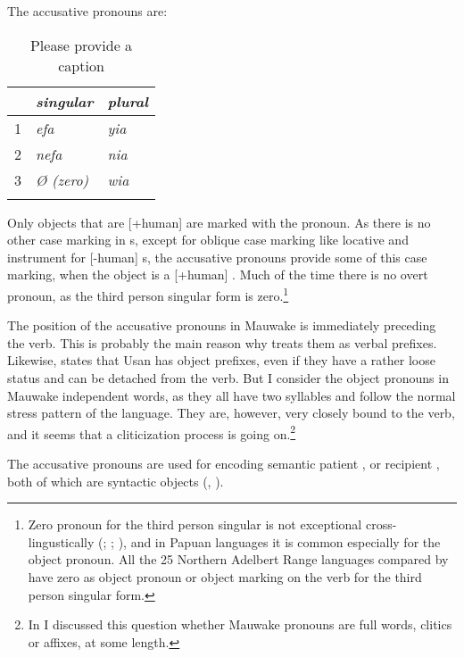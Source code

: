 The accusative pronouns are:

\begin{table}
\caption{Please provide a caption}
 
\begin{tabular}{l>{\itshape}l>{\itshape}l}
\mytoprule
 &\upshape singular &\upshape plural\\
\midrule
1 &efa &yia\\
2 &nefa &nia\\
3 &{\O} (zero) &wia\\
\mybottomrule
\end{tabular}
\end{table}


Only objects that are [+human] are marked with the pronoun. As there is no other case marking in s, except for oblique case marking like locative and instrument for [\nobreakdash-human] s, the accusative pronouns provide some of this case marking, when the object is a [+human] . Much of the time there is no overt pronoun, as the third person singular form is zero.\footnote{Zero pronoun for the third person singular is not exceptional cross-lingustically (\citealt[278]{Lyons1968}; \citealt[66]{Foley1986}; \citealt[166]{Givon1976}), and in Papuan languages it is common especially for the object pronoun. All the 25 Northern Adelbert Range languages compared by \citet[9,160]{ZGraggen1980} have zero as object pronoun or object marking on the verb for the third person singular form.} 

The position of the accusative pronouns in Mauwake is immediately preceding the verb. This is probably the main reason why \citet{ZGraggen1971} treats them as verbal prefixes. Likewise, \citet[108]{Reesink1987} states that Usan has object prefixes, even if they have a rather loose status and can be detached from the verb. But I consider the object pronouns in Mauwake independent words, as they all have two syllables and follow the normal stress pattern of the language. They are, however, very closely bound to the verb, and it seems that a cliticization process is going on.\footnote{In \citet{Jarvinen1991} I discussed this question whether Mauwake pronouns are full words, clitics or affixes, at some length.} 

The accusative pronouns are used for encoding semantic patient , or recipient , both of which are syntactic objects (, ). 

